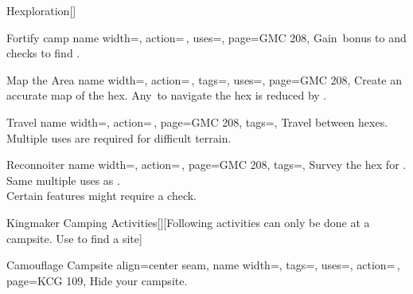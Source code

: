 \begin{PageFront}
\begin{Tables}{\frontTableHeight}
\begin{Table}{Hexploration}[]
\begin{entry}{Fortify camp}{%
                name width=\activityLength,%
                action=\,,
                uses=\Crafting,
                page=GMC 208,
            }
                Gain \,\Cirm bonus to  and  checks to find
                .
            \end{entry}
            \begin{entry}{Map the Area}{%
                name width=\activityLength,%
                action=\,,
                tags=\Concentrate,
                uses=\Survival,
                page=GMC 208,
            }
                Create an accurate map of the hex. Any \DC\,to navigate the hex is reduced by . \hfill
            \end{entry}
            \begin{entry}{Travel}{%
                name width=\activityLength,%
                action=\,,
                page=GMC 208,
                tags=\Move,
            }
                Travel between hexes. Multiple uses are required for difficult terrain.\hfill
                \\
            \end{entry}
            \begin{entry}{Reconnoiter}{%
                name width=\activityLength,%
                action=\,,
                page=GMC 208,
                tags=\Concentrate,
            }
                Survey the hex for .
                Same multiple uses as .\hfill
                \\
                Certain features might require a check.
            \end{entry}
        \end{Table}%
        \vfill
        \begin{Table}{Kingmaker Camping Activities}[][Following activities can only be done at a campsite. Use
         to find a site]
            \begin{entry}{Camouflage Campsite}{%
                align=center seam,
                name width=\activityLength,%
                tags=\Manipulate,
                uses={\Stealth[tags={T,S}]},
                action=\,,
                page=KCG 109,
            }
                Hide your campsite.

\end{entry}
\end{Table}
\end{Tables}
\end{PageFront}
